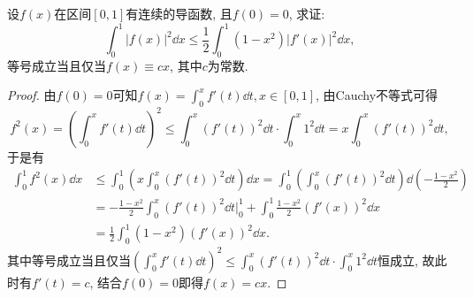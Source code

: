 设\(f(x)\)在区间\([0,1]\)有连续的导函数, 且\(f(0)=0\), 求证:\[\int_{0}^{1}|f(x)|^2\dd x\leqslant\frac{1}{2}\int_{0}^{1}(1-x^2)|f'(x)|^2\dd x,\]等号成立当且仅当\(f(x)\equiv cx\), 其中\(c\)为常数.
\begin{proof}
由\(f(0)=0\)可知\(f(x)=\int_{0}^{x}f'(t)\dd t,x\in[0,1]\), 由Cauchy不等式可得\[f^2(x)=\left(\int_{0}^{x}f'(t)\dd t\right)^2\leqslant \int_{0}^{x}\left(f'(t)\right)^2\dd t\cdot\int_{0}^{x}1^2\dd t=x\int_{0}^{x}\left(f'(t)\right)^2\dd t,\]
于是有\[\begin{split}
\int_{0}^{1}f^2(x)\dd x&\leqslant\int_{0}^{1}\left(x\int_{0}^{x}\left(f'(t)\right)^2\dd t\right)\dd x=\int_{0}^{1}\left(\int_{0}^{x}\left(f'(t)\right)^2\dd t\right)\dd\left(-\frac{1-x^2}{2}\right)\\
&=-\frac{1-x^2}{2}\int_{0}^{x}\left(f'(t)\right)^2\dd t\Big|_0^1+\int_{0}^{1}\frac{1-x^2}{2}\left(f'(x)\right)^2\dd x\\&=\frac{1}{2}\int_{0}^{1}(1-x^2)\left(f'(x)\right)^2\dd x.
\end{split}\]
其中等号成立当且仅当\(\left(\int_{0}^{x}f'(t)\dd t\right)^2\leqslant \int_{0}^{x}\left(f'(t)\right)^2\dd t\cdot\int_{0}^{x}1^2\dd t\)恒成立, 故此时有\(f'(t)=c\), 结合\(f(0)=0\)即得\(f(x)=cx\).
\end{proof}
